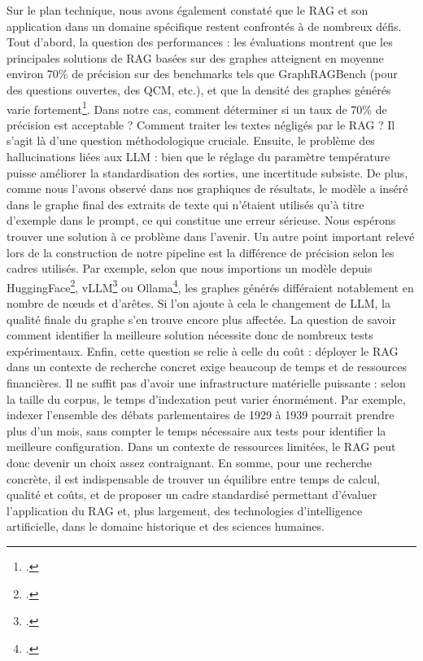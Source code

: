 \documentclass[a4paper,twoside,12pt]{book}
\begin{document}
Sur le plan technique, nous avons également constaté que le RAG et son application dans un domaine spécifique restent confrontés à de nombreux défis. Tout d'abord, la question des performances : les évaluations montrent que les principales solutions de RAG basées sur des graphes atteignent en moyenne environ 70\% de précision sur des benchmarks tels que GraphRAGBench (pour des questions ouvertes, des QCM, etc.), et que la densité des graphes générés varie fortement\footcite{xiao2025}. Dans notre cas, comment déterminer si un taux de 70\% de précision est acceptable ? Comment traiter les textes négligés par le RAG ? Il s'agit là d'une question méthodologique cruciale. Ensuite, le problème des hallucinations liées aux LLM : bien que le réglage du paramètre température puisse améliorer la standardisation des sorties, une incertitude subsiste. De plus, comme nous l'avons observé dans nos graphiques de résultats, le modèle a inséré dans le graphe final des extraits de texte qui n'étaient utilisés qu'à titre d'exemple dans le prompt, ce qui constitue une erreur sérieuse. Nous espérons trouver une solution à ce problème dans l'avenir. Un autre point important relevé lors de la construction de notre pipeline est la différence de précision selon les cadres utilisés. Par exemple, selon que nous importions un modèle depuis HuggingFace\footcite{2025d}, vLLM\footcite{zotero-794} ou Ollama\footcite{zotero-795}, les graphes générés différaient notablement en nombre de nœuds et d'arêtes. Si l'on ajoute à cela le changement de LLM, la qualité finale du graphe s'en trouve encore plus affectée. La question de savoir comment identifier la meilleure solution nécessite donc de nombreux tests expérimentaux. Enfin, cette question se relie à celle du coût : déployer le RAG dans un contexte de recherche concret exige beaucoup de temps et de ressources financières. Il ne suffit pas d'avoir une infrastructure matérielle puissante : selon la taille du corpus, le temps d'indexation peut varier énormément. Par exemple, indexer l'ensemble des débats parlementaires de 1929 à 1939 pourrait prendre plus d'un mois, sans compter le temps nécessaire aux tests pour identifier la meilleure configuration. Dans un contexte de ressources limitées, le RAG peut donc devenir un choix assez contraignant. En somme, pour une recherche concrète, il est indispensable de trouver un équilibre entre temps de calcul, qualité et coûts, et de proposer un cadre standardisé permettant d'évaluer l'application du RAG et, plus largement, des technologies d'intelligence artificielle, dans le domaine historique et des sciences humaines.
\end{document}

